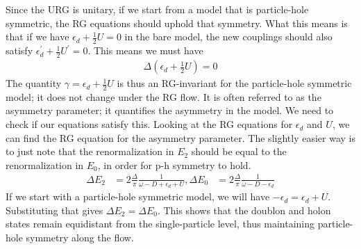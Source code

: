 \documentclass[twoside,11pt]{report}
\numberwithin{equation}{section}
\begin{document}
\\\\Since the URG is unitary, if we start from a model that is particle-hole symmetric, the RG equations should uphold that symmetry. What this means is that if we have \(\epsilon_d + \frac{1}{2} U = 0\) in the bare model, the new couplings should also satisfy \(\epsilon_d^\prime + \frac{1}{2} U^\prime = 0\). This means we must have 
\begin{equation}\begin{aligned}
	\Delta\left(\epsilon_d + \frac{1}{2} U\right) = 0
\end{aligned}\end{equation}
The quantity \(\gamma = \epsilon_d + \frac{1}{2} U\) is thus an RG-invariant for the particle-hole symmetric model; it does not change under the RG flow. It is often referred to as the asymmetry parameter; it quantifies the asymmetry in the model. We need to check if our equations satisfy this. Looking at the RG equations for \(\epsilon_d\) and \(U\), we can find the RG equation for the asymmetry parameter. The slightly easier way is to just note that the renormalization in \(E_2\) should be equal to the renormalization in \(E_0\), in order for p-h symmetry to hold.
\begin{equation}\begin{aligned}
\Delta E_2 &= 2 \frac{\Delta}{\pi}\frac{1}{\omega - D + \epsilon_d + U}, \Delta E_0 &= 2 \frac{\Delta}{\pi}\frac{1}{\omega - D - \epsilon_d}
\end{aligned}\end{equation}
If we start with a particle-hole symmetric model, we will have \(-\epsilon_d = \epsilon_d + U\). Substituting that gives \(\Delta E_2= \Delta E_0\). This shows that the doublon and holon states remain equidistant from the single-particle level, thus maintaining particle-hole symmetry along the flow.
\end{document}
